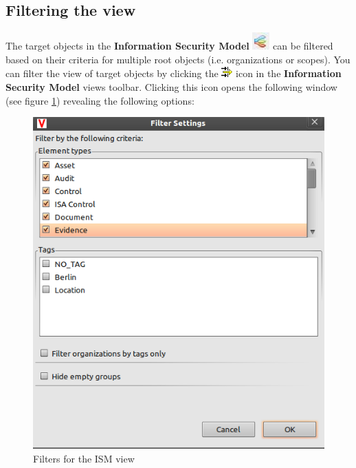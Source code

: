 \documentclass[a4paper,10pt]{book}
\begin{document}
\subsection{Filtering the view}
The target objects in the \textbf{Information Security Model} \includegraphics[height=2ex]{Icon/Informationssicherheitsmodell.png} can be filtered based on their criteria for multiple root objects (i.e. organizations or scopes).
You can filter the view of target objects by clicking the \includegraphics[height=2ex]{Icon/Filter.png} icon in the \textbf{Information Security Model} views toolbar.
Clicking this icon opens the following window (see figure \ref{Filters for the ISM view}) revealing the following options:
\newline
\begin{figure}[htb!]
  \centering
  \includegraphics[scale=.7]{Screenshot/Ism-filter-en.png}
  \caption{\label{Filters for the ISM view} Filters for the ISM view}
\end{figure}
\end{document}
